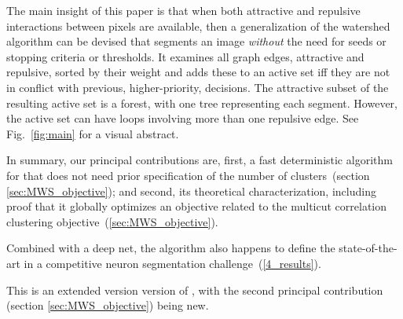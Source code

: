 The main insight of this paper is that when both attractive and repulsive interactions between pixels are available, then a generalization of the watershed algorithm can be devised that segments an image {\em without} the need for seeds or stopping criteria or thresholds. It examines all graph edges, attractive and repulsive, sorted by their weight and adds these to an active set iff they are not in conflict with previous, higher-priority, decisions. The attractive subset of the resulting active set  is a forest, with one tree representing each segment. However, the active set can have loops involving more than one repulsive edge.
 See Fig.~\ref{fig:main} for a visual abstract. 

In summary, our principal contributions are, first, 
a fast deterministic algorithm for  that does not need prior specification of the number of clusters~(section \ref{sec:MWS_objective}); and second, its theoretical characterization, including proof that it globally optimizes an objective related to the multicut correlation clustering objective~(\ref{sec:MWS_objective}).

Combined with a deep net, the algorithm also happens to define the state-of-the-art in a competitive neuron segmentation challenge~(\autoref{4_results}).

This is an extended version version of \cite{wolf2018mutex}, with the second principal contribution (section \ref{sec:MWS_objective}) being new.


